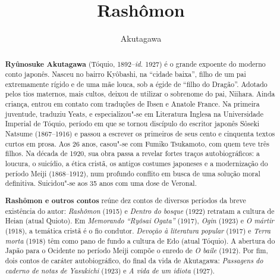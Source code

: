 \documentclass[12pt]{extarticle}
\begin{document}
\newcommand{\AutorLivro}{Akutagawa}
\newcommand{\TituloLivro}{Rashômon}
\newcommand{\Tema}{Ficção, mistério e fantasia}
\newcommand{\Genero}{Conto, crônica e novela}
\newcommand{\imagemCapa}{./images/PNLD0009-01.png}
\newcommand{\issnppub}{---}
\newcommand{\issnepub}{---}
\newcommand{\colaborador}{\textbf{Cesar Augusto Araujo Oyakawa, Bruno Gradella e Vicente Castro} é uma pessoa incrível e vai fazer um bom serviço.}


\title{\TituloLivro}
\author{\AutorLivro}
\def\authornotes{\colaborador}

\date{}
\maketitle

\baselineskip\par

\begin{abstract}

\textbf{Ryûnosuke Akutagawa} (Tóquio, 1892--\textit{id.} 1927) é o grande expoente 
do moderno conto japonês. Nasceu no bairro Kyôbashi, na ``cidade
baixa'', filho de um pai extremamente rígido e de uma mãe louca, sob a égide de 
``filho do Dragão''. Adotado pelos tios maternos, mais cultos,
deixou de utilizar o sobrenome do pai, Niihara. Ainda criança, entrou
em contato com traduções de Ibsen e Anatole France. Na primeira
juventude, traduziu Yeats, e especializou"-se em Literatura Inglesa na
Universidade Imperial de Tóquio, período em que se tornou discípulo do
escritor japonês Sôseki Natsume (1867--1916) e passou a escrever os
primeiros de seus cento e cinquenta textos curtos em prosa. Aos 26
anos, casou"-se com Fumiko Tsukamoto, com quem teve três filhos.
Na década de 1920, sua obra passa a revelar fortes traços
autobiográficos: a loucura, o suicídio, a ética cristã, os antigos 
costumes japoneses e a modernização do período Meiji (1868--1912),
num profundo conflito em busca de uma solução moral definitiva. 
Suicidou"-se aos 35 anos com uma dose de Veronal. 
        
\textbf{Rashômon e outros contos} reúne dez contos de diversos períodos da
breve existência do autor: \textit{Rashômon} (1915) e \textit{Dentro do bosque} (1922) 
retratam a cultura de Heian (atual Quioto). Em \textit{Memorando ``Ryôsai Ogata''} (1917), 
\textit{Ogin} (1923) e \textit{O mártir} (1918), a temática cristã é o fio condutor. 
\textit{Devoção à literatura popular} (1917) e \textit{Terra morta} (1918) têm como pano de fundo 
a cultura de Edo (atual Tóquio). A abertura do Japão para o Ocidente no período 
Meiji compõe o enredo de \textit{O baile} (1912). Por fim, dois contos de caráter autobiográfico, 
do final da vida de Akutagawa: \textit{Passagens do caderno de notas de Yasukichi} (1923) 
e \textit{A vida de um idiota} (1927).      
\end{abstract}
\end{document}
